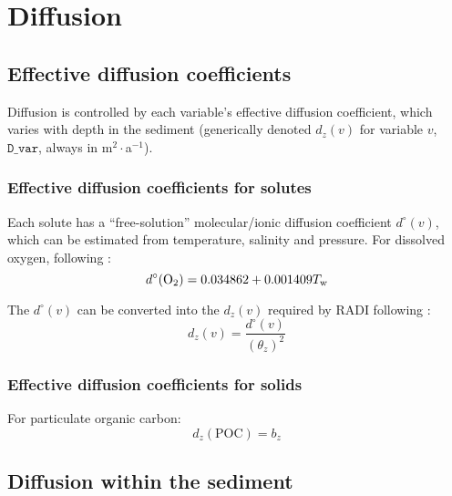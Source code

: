 \documentclass[a4paper]{article}
\newcommand{\code}[1]{\texttt{#1}}
\begin{document}

\section{Diffusion}\label{sx:diffusion}

\subsection{Effective diffusion coefficients}

Diffusion is controlled by each variable's effective diffusion coefficient, which varies with depth in the sediment (generically denoted $d_z(v)$ for variable $v$, $\code{D\_var}$, always in m$^2\cdot$a$^{-1}$).


\subsubsection{Effective diffusion coefficients for solutes}

Each solute has a ``free-solution'' molecular/ionic diffusion coefficient $d^\circ(v)$, which can be estimated from temperature, salinity and pressure. For dissolved oxygen, following \citet{li_diffusion_1974}:
\begin{equation}
d^\circ(\ce{O2}) = 0.034862 + 0.001409 T_\mathrm{w}
\end{equation}

The $d^\circ(v)$ can be converted into the $d_z(v)$ required by RADI following \citet{boudreau_method--lines_1996}:
\begin{equation}
d_z(v) = \frac{d^\circ(v)}{(\theta_z)^2}
\end{equation}


\subsubsection{Effective diffusion coefficients for solids}

For particulate organic carbon:
\begin{equation}
d_z(\mathrm{POC}) = b_z
\end{equation}


\subsection{Diffusion within the sediment}
\end{document}
